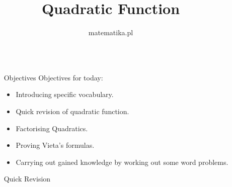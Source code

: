 \documentclass[final]{beamer}
\title{Quadratic Function} %
\author{matematika.pl} %
\institute{2015} %
\newlength{\sepwid}
\newlength{\onecolwid}
\begin{document}
  
  
  \setlength{\belowcaptionskip}{2ex} %
  \setlength\belowdisplayshortskip{2ex} %
  
  \begin{frame}[t] %
  
  \begin{columns}[t] %
  
  \begin{column}{\sepwid}\end{column} %
  
  \begin{column}{\onecolwid} %
  
  
  \begin{alertblock}{Objectives}
  Objectives for today:
  \begin{itemize}
  \item Introducing specific vocabulary.
  \item Quick revision of quadratic function.
  \item Factorising Quadratics.
  \item Proving Vieta's formulas.
  \item Carrying out gained knowledge by working out some word problems.
  \end{itemize}
  
  \end{alertblock}
  
    
    \begin{block}{Quick Revision}
  

\end{block}
\end{column}
\end{columns}
\end{frame}
\end{document}
